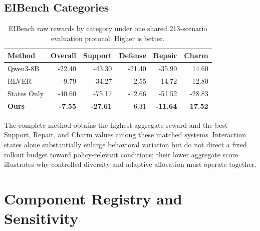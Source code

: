 \subsection{EIBench Categories}
\begin{table}[t]
\centering
\small
\setlength{\tabcolsep}{2pt}
\begin{tabular}{lrrrrr}
\toprule
Method & Overall & Support & Defense & Repair & Charm \\
\midrule
Qwen3-8B & -22.40 & -43.30 & -21.40 & -35.90 & 14.60 \\
RLVER & -9.79 & -34.27 & -2.55 & -14.72 & 12.80 \\
States Only & -40.60 & -75.17 & -12.66 & -51.52 & -28.83 \\
\textbf{Ours} & \textbf{-7.55} & \textbf{-27.61} & -6.31 & \textbf{-11.64} & \textbf{17.52} \\
\bottomrule
\end{tabular}
\caption{EIBench raw rewards by category under one shared 213-scenario
evaluation protocol. Higher is better.}
\label{tab:supp-eibench-categories}
\end{table}

The complete method obtains the highest aggregate reward and the best Support,
Repair, and Charm values among these matched systems. Interaction states alone
substantially enlarge behavioral variation but do not direct a fixed rollout
budget toward policy-relevant conditions; their lower aggregate score
illustrates why controlled diversity and adaptive allocation must operate
together.

\section{Component Registry and Sensitivity}
